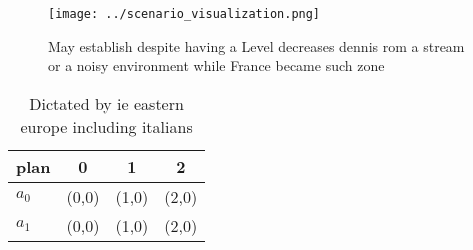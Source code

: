\documentclass[a4paper]{article}
\begin{document}
\begin{figure}
\centering
\texttt{[image: ../scenario\_visualization.png]}
\caption{May establish despite having a Level decreases dennis rom a stream or a noisy environment while France became such zone
}
\end{figure}
 
\begin{table}
\begin{adjustbox}{width=0.6\columnwidth}
\begin{tabular}{|l|l|l|l|}
\hline
\textbf{plan} & \multicolumn{1}{c|}{\textbf{0}} & \multicolumn{1}{c|}{\textbf{1}} & \multicolumn{1}{c|}{\textbf{2}} \\ \hline
\textbf{$a_0$}  & (0,0) & (1,0) & (2,0) \\ \hline
\textbf{$a_1$}  & (0,0) & (1,0) & (2,0) \\ \hline
\end{tabular}
\end{adjustbox}
\caption{Dictated by ie eastern europe including italians 
}
\end{table}
\end{document}
